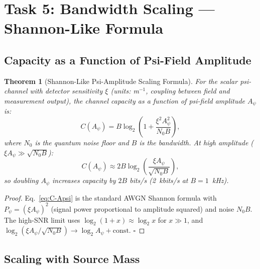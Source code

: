 \documentclass[aps,prd,twocolumn,superscriptaddress,nofootinbib]{revtex4-2}
\newtheorem{theorem}{Theorem}
\begin{document}
\section{Task 5: Bandwidth Scaling --- Shannon-Like Formula}
\label{sec:bw-scaling}

\subsection{Capacity as a Function of Psi-Field Amplitude}

\begin{theorem}[Shannon-Like Psi-Amplitude Scaling Formula]
\label{thm:shannon-scaling}
For the scalar psi-channel with detector sensitivity $\xi$ (units: m$^{-1}$,
coupling between field and measurement output), the channel capacity as
a function of psi-field amplitude $A_\psi$ is:
\begin{equation}
\boxed{
C(A_\psi) = B \log_2\!\left(1 + \frac{\xi^2 A_\psi^2}{N_0 B}\right),
}
\label{eq:C-Apsi}
\end{equation}
where $N_0$ is the quantum noise floor and $B$ is the bandwidth.
At high amplitude ($\xi A_\psi \gg \sqrt{N_0 B}$):
\begin{equation}
C(A_\psi) \approx 2B\log_2\!\left(\frac{\xi A_\psi}{\sqrt{N_0 B}}\right),
\label{eq:C-Apsi-hsnr}
\end{equation}
so doubling $A_\psi$ increases capacity by $2B$ bits/s (2~kbits/s at $B=1$~kHz).
\end{theorem}

\begin{proof}
Eq.~\eqref{eq:C-Apsi} is the standard AWGN Shannon formula with
$P_\psi = (\xi A_\psi)^2$ (signal power proportional to amplitude squared)
and noise $N_0 B$. The high-SNR limit uses $\log_2(1+x) \approx \log_2 x$
for $x \gg 1$, and $\log_2(\xi A_\psi/\sqrt{N_0 B}) \to \log_2 A_\psi + \text{const}$. $\square$
\end{proof}

\subsection{Scaling with Source Mass}
\end{document}
